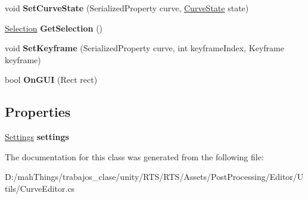 \begin{DoxyCompactItemize}
\item 
\mbox{\label{class_unity_editor_1_1_post_processing_1_1_curve_editor_adda8f9c24e3ca6427dc4925149eb335f}} 
void {\bfseries Set\+Curve\+State} (Serialized\+Property curve, \mbox{\hyperlink{struct_unity_editor_1_1_post_processing_1_1_curve_editor_1_1_curve_state}{Curve\+State}} state)
\item 
\mbox{\label{class_unity_editor_1_1_post_processing_1_1_curve_editor_aa582a6afdd1d913fcf3f4487aad3aa23}} 
\mbox{\hyperlink{struct_unity_editor_1_1_post_processing_1_1_curve_editor_1_1_selection}{Selection}} {\bfseries Get\+Selection} ()
\item 
\mbox{\label{class_unity_editor_1_1_post_processing_1_1_curve_editor_ab7f943a6c54cfc8ac566368fd75f1ec3}} 
void {\bfseries Set\+Keyframe} (Serialized\+Property curve, int keyframe\+Index, Keyframe keyframe)
\item 
\mbox{\label{class_unity_editor_1_1_post_processing_1_1_curve_editor_acdfe09e9ed98fd21d533de5b7b46f0a2}} 
bool {\bfseries On\+G\+UI} (Rect rect)
\end{DoxyCompactItemize}
\subsection*{Properties}
\begin{DoxyCompactItemize}
\item 
\mbox{\label{class_unity_editor_1_1_post_processing_1_1_curve_editor_abd5edf07120ac0632d77f9b6701311c0}} 
\mbox{\hyperlink{struct_unity_editor_1_1_post_processing_1_1_curve_editor_1_1_settings}{Settings}} {\bfseries settings}
\end{DoxyCompactItemize}


The documentation for this class was generated from the following file\+:\begin{DoxyCompactItemize}
\item 
D\+:/mah\+Things/trabajos\+\_\+clase/unity/\+R\+T\+S/\+R\+T\+S/\+Assets/\+Post\+Processing/\+Editor/\+Utils/Curve\+Editor.\+cs\end{DoxyCompactItemize}
